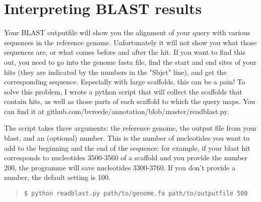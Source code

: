 \documentclass[11pt]{article}
\begin{document}
\section{Interpreting BLAST results}
Your BLAST outputfile will show you the alignment of your query with various sequences in the reference genome. Unfortunately it will not show you what those sequences are, or what comes before and after the hit. If you want to find this out, you need to go into the genome fasta file, find the start and end sites of your hits (they are indicated by the numbers in the "Sbjct" line), and get the corresponding sequence. Especially with large scaffolds, this can be a pain! To solve this problem, I wrote a python script that will collect the scaffolds that contain hits, as well as those parts of each scaffold to which the query maps. You can find it at github.com/bvreede/annotation/blob/master/readblast.py.\par
The script takes three arguments: the reference genome, the output file from your blast, and an (optional) number. This is the number of nucleotides you want to add to the beginning and the end of the sequence: for example, if your blast hit corresponds to nucleotides 3500-3560 of a scaffold and you provide the number 200, the programme will save nucleotides 3300-3760. If you don't provide a number, the default setting is 100.
\begin{quote}
\begin{verbatim}
$ python readblast.py path/to/genome.fa path/to/outputfile 500
\end{verbatim}
\end{quote}
\end{document}
